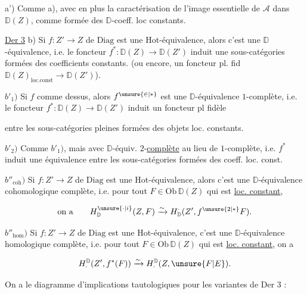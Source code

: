 a') Comme a), avec en plus la caractérisation de l'image essentielle de  $\mathcal A$ dans $\mathbb D(Z)$, comme formée des $\mathbb D$-coeff. loc constants.

\uline{Der 3} b) Si $f:Z'\to Z$ de $\mathrm{Diag}$ est une Hot-équivalence, alors c'est une $\mathbb D$-équivalence, i.e. le foncteur $f^*:\mathbb D(Z)\to\mathbb D(Z')$ induit une    sous-catégories formées des coefficients constants. (ou encore, un foncteur pl. fid $\mathbb D(Z)_{\mathrm{loc.const}}\longrightarrow\mathbb D(Z')$).

$b'_1)$ Si $f$ comme dessus, alors $f^{\unsure{\in|*}}$ est une $\mathbb D$-équivalence $1$-complète, i.e. le foncteur  $f^*:\mathbb D(Z)\to\mathbb D(Z')$ induit un foncteur pl fidèle



entre les sous-catégories pleines formées des objets loc. constants.

$b'_2)$ Comme $b'_1)$, mais avec $\mathbb D$-équiv. $2$-\uline{complète} au lieu de $1$-complète, i.e. $f^*$ induit une équivalence entre les sous-catégories formées des coeff. loc. const.

$b''_{\mathrm{coh}})$ Si $f:Z'\to Z$ de $\mathrm{Diag}$ est une Hot-équivalence, alors c'est une $\mathbb D$-équivalence cohomologique complète, i.e. pour tout $F\in\mathrm{Ob}\,\mathbb D(Z)$ qui est \uline{loc. constant},

\[
\text{on a}\qquad H^{\unsure{\cdot|i}}_{\mathbb D}(Z,F)\xrightarrow{\sim}H^{\cdot}_{\mathbb D}(Z',f^{\unsure{2|*}}F).
\]

$b''_{\mathrm{hom}})$ Si $f:Z'\to Z$ de $\mathrm{Diag}$ est une Hot-équivalence, c'est une $\mathbb D$-équivalence homologique complète, i.e. pour tout $F\in\mathrm{Ob}\,\mathbb D(Z)$ qui est \uline{loc. constant}, on a

\[
H_{\cdot}^{\mathbb D}(Z',f^*(F))\xrightarrow{\sim}H_{\cdot}^{\mathbb D}(Z,\unsure{F|E}).
\]


On a le diagramme d'implications tautologiques pour les variantes de Der 3 :


